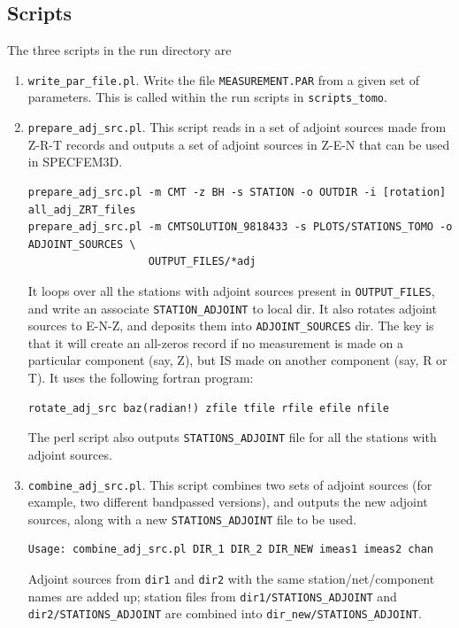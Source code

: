 \documentclass[11pt,titlepage,fleqn]{article}
\begin{document}

\subsection{Scripts}

The three scripts in the run directory are
%
\begin{enumerate}
\item \verb+write_par_file.pl+. Write the file \verb+MEASUREMENT.PAR+ from a given set of parameters. This is called within the run scripts in \verb+scripts_tomo+.

\item \verb+prepare_adj_src.pl+. This script reads in a set of adjoint sources made from Z-R-T records and outputs a set of adjoint sources in Z-E-N that can be used in SPECFEM3D.
\begin{verbatim}
prepare_adj_src.pl -m CMT -z BH -s STATION -o OUTDIR -i [rotation] all_adj_ZRT_files
prepare_adj_src.pl -m CMTSOLUTION_9818433 -s PLOTS/STATIONS_TOMO -o ADJOINT_SOURCES \
                   OUTPUT_FILES/*adj
\end{verbatim}
It loops over all the stations with adjoint sources present in \verb+OUTPUT_FILES+, and write an associate \verb+STATION_ADJOINT+ to local dir. It also rotates adjoint sources to E-N-Z, and deposits them into \verb+ADJOINT_SOURCES+ dir.
The key is that it will create an all-zeros record if no measurement is made on a particular component (say, Z), but IS made on another component (say, R or T). It uses the following fortran
program:
\begin{verbatim}
rotate_adj_src baz(radian!) zfile tfile rfile efile nfile
\end{verbatim}
The perl script also outputs \verb+STATIONS_ADJOINT+ file for all the stations with adjoint sources.

\item \verb+combine_adj_src.pl+. This script combines two sets of adjoint sources (for example, two different bandpassed versions), and outputs the new adjoint sources, along with a new \verb+STATIONS_ADJOINT+ file to be used.
\begin{verbatim}
Usage: combine_adj_src.pl DIR_1 DIR_2 DIR_NEW imeas1 imeas2 chan
\end{verbatim}
Adjoint sources from \verb+dir1+ and \verb+dir2+ with the same station/net/component names are added up; station files
from \verb+dir1/STATIONS_ADJOINT+ and \verb+dir2/STATIONS_ADJOINT+ are combined into \verb+dir_new/STATIONS_ADJOINT+.
\end{enumerate}
%
\end{document}
